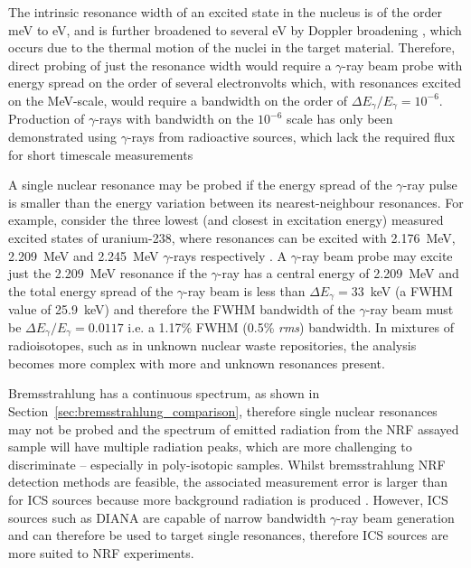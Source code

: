 \documentclass[../main.tex]{subfiles}
\begin{document}
The intrinsic resonance width of an excited state in the nucleus is of the order \si{\milli\electronvolt} to \si{\electronvolt}, and is further broadened to several \si{\electronvolt} by Doppler broadening \cite{angell2015demonstration}, which occurs due to the thermal motion of the nuclei in the target material. Therefore, direct probing of just the resonance width would require a $\gamma$-ray beam probe with energy spread on the order of several electronvolts which, with resonances excited on the \si{\mega\electronvolt}-scale, would require a bandwidth on the order of $\Delta E_{\gamma}/E_{\gamma} = 10^{-6}$. Production of $\gamma$-rays with bandwidth on the $10^{-6}$ scale has only been demonstrated using $\gamma$-rays from radioactive sources, which lack the required flux for short timescale measurements

A single nuclear resonance may be probed if the energy spread of the $\gamma$-ray pulse is smaller than the energy variation between its nearest-neighbour resonances. For example, consider the three lowest (and closest in excitation energy) measured excited states of uranium-238, where resonances can be excited with 2.176~\si{\mega\electronvolt}, 2.209~\si{\mega\electronvolt} and 2.245~\si{\mega\electronvolt} $\gamma$-rays respectively \cite{quiter2011transmission}. A $\gamma$-ray beam probe may excite just the 2.209~\si{\mega\electronvolt} resonance if the $\gamma$-ray has a central energy of 2.209~\si{\mega\electronvolt} and the total energy spread of the $\gamma$-ray beam is less than $\Delta E_{\gamma} = 33$~\si{\kilo\electronvolt} (a FWHM value of 25.9~\si{\kilo\electronvolt}) and therefore the FWHM bandwidth of the $\gamma$-ray beam must be $\Delta E_{\gamma}/E_{\gamma} = 0.0117$ i.e. a 1.17\% FWHM (0.5\% \textit{rms}) bandwidth. In mixtures of radioisotopes, such as in unknown nuclear waste repositories, the analysis becomes more complex with more and unknown resonances present. 

Bremsstrahlung has a continuous spectrum, as shown in Section~\ref{sec:bremsstrahlung_comparison}, therefore single nuclear resonances may not be probed and the spectrum of emitted radiation from the NRF assayed sample will have multiple radiation peaks, which are more challenging to discriminate -- especially in poly-isotopic samples. Whilst bremsstrahlung NRF detection methods are feasible, the associated measurement error is larger than for ICS sources because more background radiation is produced \cite{angell2015demonstration}. However, ICS sources such as DIANA are capable of narrow bandwidth $\gamma$-ray beam generation and can therefore be used to target single resonances, therefore ICS sources are more suited to NRF experiments.  
\end{document}
